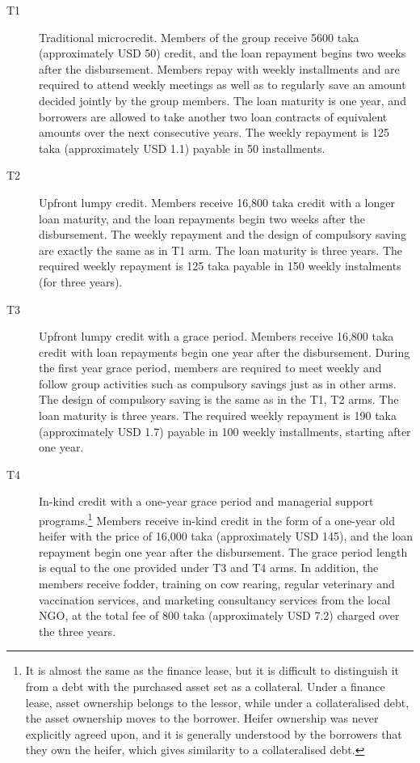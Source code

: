 	\begin{description}
	\vspace{1.0ex}\setlength{\itemsep}{1.0ex}\setlength{\baselineskip}{12pt}
	\item[T1]	Traditional microcredit. Members of the group receive 5600 taka (approximately USD 50) credit, and the loan repayment begins two weeks after the disbursement. Members repay with weekly installments and are required to attend weekly meetings as well as to regularly save an amount decided jointly by the group members. The loan maturity is one year, and borrowers are allowed to take another two loan contracts of equivalent amounts over the next consecutive years. The weekly repayment is 125 taka (approximately USD 1.1) payable in 50 installments.
	\item[T2]	Upfront lumpy credit. Members receive 16,800 taka credit with a longer loan maturity, and the loan repayments begin two weeks after the disbursement. The weekly repayment and the design of compulsory saving are exactly the same as in \textsf{T1} arm. The loan maturity is three years. The required weekly repayment is 125 taka payable in 150 weekly instalments (for three years). 
	\item[T3]	Upfront lumpy credit with a grace period. Members receive 16,800 taka credit with loan repayments begin one year after the disbursement. During the first year grace period, members are required to meet weekly and follow group activities such as compulsory savings just as in other arms. The design of compulsory saving is the same as in the \textsf{T1}, \textsf{T2} arms. The loan maturity is three years. The required weekly repayment is 190 taka (approximately USD 1.7) payable in 100 weekly installments, starting after one year.
	\item[T4]	In-kind credit with a one-year grace period and managerial support programs.\footnote{It is almost the same as the finance lease, but it is difficult to distinguish it from a debt with the purchased asset set as a collateral. Under a finance lease, asset ownership belongs to the lessor, while under a collateralised debt, the asset ownership moves to the borrower. Heifer ownership was never explicitly agreed upon, and it is generally understood by the borrowers that they own the heifer, which gives similarity to a collateralised debt. } Members receive in-kind credit in the form of a one-year old heifer with the price of 16,000 taka (approximately USD 145), and the loan repayment begin one year after the disbursement. The grace period length is equal to the one provided under \textsf{T3} and \textsf{T4} arms. %
	In addition, the members receive fodder, training on cow rearing, regular veterinary and vaccination services, and marketing consultancy services from the local NGO, at the total fee of 800 taka (approximately USD 7.2) charged over the three years. 
	\end{description}

